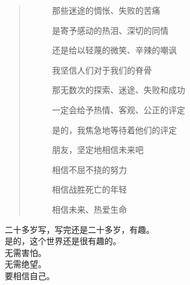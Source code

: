 \begin{multicols}{\theparacolNo}
\begin{quote}
\begin{spacing}{0.5}
{{\begin{description}
					\item[\textcolor{Gray}{\faQuoteRight}] 那些迷途的惆怅、失败的苦痛
					\item[\textcolor{Gray}{\faQuoteRight}] 是寄予感动的热泪、深切的同情
					\item[\textcolor{Gray}{\faQuoteRight}] 还是给以轻蔑的微笑、辛辣的嘲讽
					\item[\textcolor{Gray}{\faQuoteRight}] 我坚信人们对于我们的脊骨
					\item[\textcolor{Gray}{\faQuoteRight}] 那无数次的探索、迷途、失败和成功
					\item[\textcolor{Gray}{\faQuoteRight}] 一定会给予热情、客观、公正的评定
					\item[\textcolor{Gray}{\faQuoteRight}] 是的，我焦急地等待着他们的评定
					\item[\textcolor{Gray}{\faQuoteRight}] 朋友，坚定地相信未来吧
					\item[\textcolor{Gray}{\faQuoteRight}] 相信不屈不挠的努力
					\item[\textcolor{Gray}{\faQuoteRight}] 相信战胜死亡的年轻
					\item[\textcolor{Gray}{\faQuoteRight}] 相信未来、热爱生命
				\end{description}
		}}
	\end{spacing}
\end{quote}

二十多岁写，写完还是二十多岁，有趣。\\

是的，这个世界还是很有趣的。\\

无需害怕。\\

无需绝望。\\

要相信自己。\\
\ifnum{}
	\end{multicols}
\fi
